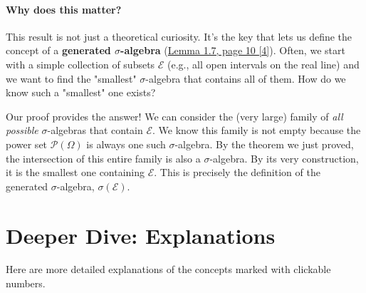 \documentclass[11pt,a4paper]{article}
\theoremstyle{tutorstyle}
\newcommand{\powerset}{\mathcal{P}} %
\begin{document}
\paragraph{Why does this matter?}
This result is not just a theoretical curiosity. It's the key that lets us define the concept of a \textbf{generated $\sigma$-algebra} (\hyperlink{note4}{Lemma 1.7, page 10 [4]}). Often, we start with a simple collection of subsets $\mathcal{E}$ (e.g., all open intervals on the real line) and we want to find the "smallest" $\sigma$-algebra that contains all of them. How do we know such a "smallest" one exists?

Our proof provides the answer! We can consider the (very large) family of \emph{all possible} $\sigma$-algebras that contain $\mathcal{E}$. We know this family is not empty because the power set $\powerset(\Omega)$ is always one such $\sigma$-algebra. By the theorem we just proved, the intersection of this entire family is also a $\sigma$-algebra. By its very construction, it is the smallest one containing $\mathcal{E}$. This is precisely the definition of the generated $\sigma$-algebra, $\sigma(\mathcal{E})$.

\newpage

\section*{Deeper Dive: Explanations}

Here are more detailed explanations of the concepts marked with clickable numbers.
\end{document}
